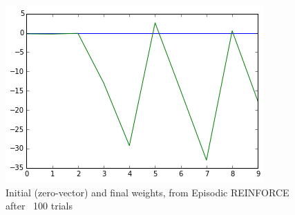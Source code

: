 \documentclass{article}
\begin{document}
\begin{figure}
\centering
\includegraphics[scale=0.5]{figures/policySearch_zeroVector_weights.png}
\caption{Initial (zero-vector) and final weights, from Episodic REINFORCE after ~100 trials}
\label{figures/policySearch_zeroVector_weights.png}
\end{figure}







\end{document}
